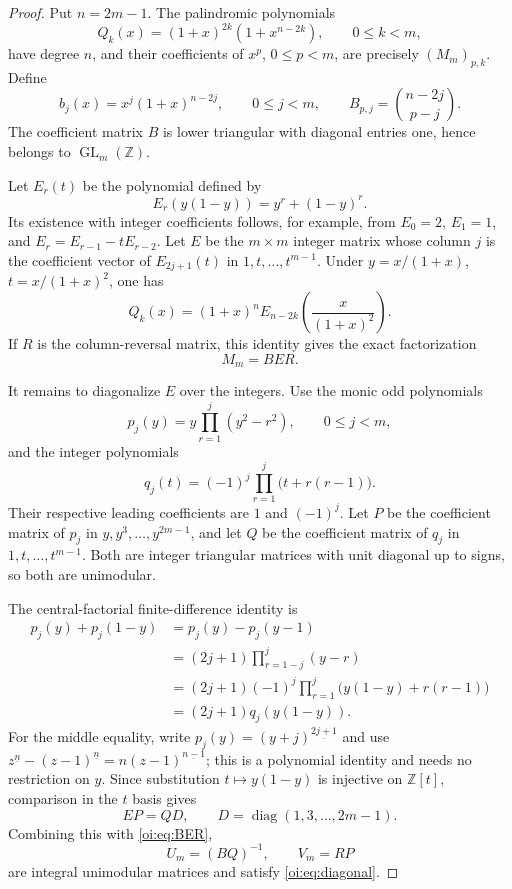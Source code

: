 \begin{proof}
Put $n=2m-1$.  The palindromic polynomials
\[
 Q_k(x)=(1+x)^{2k}(1+x^{n-2k}),\qquad 0\leq k<m,
\]
have degree $n$, and their coefficients of $x^p$, $0\leq p<m$, are
precisely $(M_m)_{p,k}$.  Define
\[
 b_j(x)=x^j(1+x)^{n-2j},\qquad 0\leq j<m,
 \qquad
 B_{p,j}=\binom{n-2j}{p-j}.
\]
The coefficient matrix $B$ is lower triangular with diagonal entries
one, hence belongs to $\operatorname{GL}_m(\mathbb Z)$.

Let $E_r(t)$ be the polynomial defined by
\[
 E_r(y(1-y))=y^r+(1-y)^r.
\]
Its existence with integer coefficients follows, for example, from
$E_0=2$, $E_1=1$, and $E_r=E_{r-1}-tE_{r-2}$.
Let $E$ be the $m\times m$ integer matrix whose column $j$ is the
coefficient vector of $E_{2j+1}(t)$ in $1,t,\ldots,t^{m-1}$.
Under $y=x/(1+x)$, $t=x/(1+x)^2$, one has
\[
 Q_k(x)=(1+x)^n E_{n-2k}\!\left(\frac{x}{(1+x)^2}\right).
\]
If $R$ is the column-reversal matrix, this identity gives the exact
factorization
\begin{equation}\label{oi:eq:BER}
 M_m=BER.
\end{equation}

It remains to diagonalize $E$ over the integers.  Use the monic odd
polynomials
\[
 p_j(y)=y\prod_{r=1}^j(y^2-r^2),\qquad 0\leq j<m,
\]
and the integer polynomials
\[
 q_j(t)=(-1)^j\prod_{r=1}^j\bigl(t+r(r-1)\bigr).
\]
Their respective leading coefficients are $1$ and $(-1)^j$.
Let $P$ be the coefficient matrix of $p_j$ in
$y,y^3,\ldots,y^{2m-1}$, and let $Q$ be the coefficient matrix of
$q_j$ in $1,t,\ldots,t^{m-1}$.  Both are integer triangular matrices
with unit diagonal up to signs, so both are unimodular.

The central-factorial finite-difference identity is
\begin{align*}
 p_j(y)+p_j(1-y)
 &=p_j(y)-p_j(y-1)\\
 &=(2j+1)\prod_{r=1-j}^{j}(y-r)\\
 &=(2j+1)(-1)^j
       \prod_{r=1}^j\bigl(y(1-y)+r(r-1)\bigr)\\
 &=(2j+1)q_j(y(1-y)).
\end{align*}
For the middle equality, write
$p_j(y)=(y+j)^{\underline{2j+1}}$ and use
$z^{\underline n}-(z-1)^{\underline n}
=n(z-1)^{\underline{n-1}}$; this is a polynomial identity and needs no
restriction on $y$.  Since substitution $t\mapsto y(1-y)$ is injective
on $\mathbb Z[t]$, comparison in the $t$ basis gives
\[
 EP=QD,\qquad D=\operatorname{diag}(1,3,\ldots,2m-1).
\]
Combining this with \eqref{oi:eq:BER},
\[
 U_m=(BQ)^{-1},\qquad V_m=RP
\]
are integral unimodular matrices and satisfy \eqref{oi:eq:diagonal}.


\end{proof}
